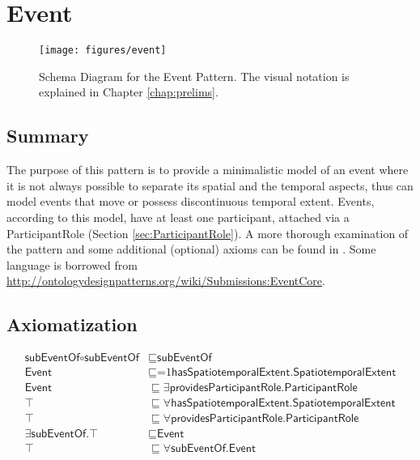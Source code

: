 \section{Event}
\label{sec:Event}
\begin{figure}[h!]
\begin{center}
\texttt{[image: figures/event]}
\end{center}
\caption{Schema Diagram for the Event Pattern. The visual notation is explained in Chapter \ref{chap:prelims}.}
\label{fig:Event}
\end{figure}
\subsection{Summary}
\label{sum:Event}
The purpose of this pattern is to provide a minimalistic model of an event where it is not always possible to separate its spatial and the temporal aspects, thus can model events that move or possess discontinuous temporal extent. Events, according to this model, have at least one participant, attached via a \textsf{ParticipantRole} (Section \ref{sec:ParticipantRole}). A more thorough examination of the pattern and some additional (optional) axioms can be found in \cite{event}. Some language is borrowed from \url{http://ontologydesignpatterns.org/wiki/Submissions:EventCore}.

\subsection{Axiomatization}
\label{axs:Event}
\begin{align}
\textsf{subEventOf} \circ \textsf{subEventOf} &\sqsubseteq \textsf{subEventOf} \\
\textsf{Event} &\sqsubseteq \text{=1} \textsf{hasSpatiotemporalExtent.SpatiotemporalExtent} \\
\textsf{Event} &\sqsubseteq \exists \textsf{providesParticipantRole.ParticipantRole} \\
\top &\sqsubseteq \forall \textsf{hasSpatiotemporalExtent.SpatiotemporalExtent} \\
\top &\sqsubseteq \forall \textsf{providesParticipantRole.ParticipantRole} \\
\exists \textsf{subEventOf.}\top &\sqsubseteq \textsf{Event} \\
\top &\sqsubseteq \forall \textsf{subEventOf.Event}
\end{align}


